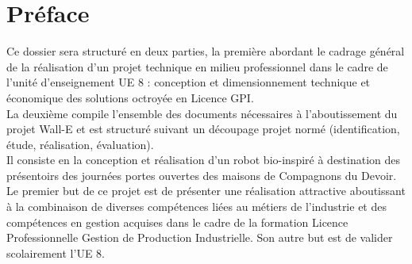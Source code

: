

\begin{comment}

\documentclass[a4paper, 11pt, twoside, fleqn]{memoir}

\usepackage{AOCDTF-cnam}

\marqueurchapitre
\decoupagechapitre{1} %



	\openleft %

\end{comment}

\chapter{Préface}

Ce dossier sera structuré en deux parties, la première abordant le cadrage général de la réalisation d'un projet technique en milieu professionnel dans le cadre de l'unité d'enseignement \og UE 8 : conception et dimensionnement technique et économique des solutions \fg{} octroyée en Licence GPI.\\ La deuxième compile l'ensemble des documents nécessaires à l'aboutissement du projet Wall-E et est structuré suivant un découpage projet normé (identification, étude, réalisation, évaluation).\\
Il consiste en la conception et réalisation d'un robot \og bio-inspiré \fg{} à destination des présentoirs des journées portes ouvertes des maisons de Compagnons du Devoir.\\

Le premier but de ce projet est de présenter une réalisation attractive aboutissant à la combinaison de diverses compétences liées au métiers de l'industrie et des compétences en gestion acquises dans le cadre de la formation Licence Professionnelle Gestion de Production Industrielle. Son autre but est de valider scolairement l'UE 8.\\

